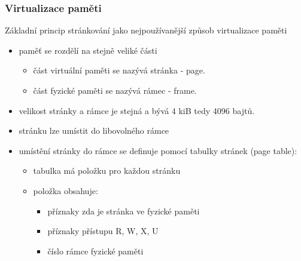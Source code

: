 \documentclass{beamer}
\begin{document}
\begin{frame}
\frametitle{Virtualizace paměti}

Základní princip stránkování jako nejpoužívanější způsob virtualizace paměti
\begin{itemize}
\item paměť se rozdělí na stejně veliké části
\begin{itemize}
\item část virtuální paměti se nazývá stránka - page.
\item část fyzické paměti se nazývá rámec - frame.
\end{itemize}
\item velikost stránky a rámce je stejná a bývá 4 kiB tedy 4096 bajtů.
\item stránku lze umístit do libovolného rámce
\item umístění stránky do rámce se definuje pomocí tabulky stránek (page table):
\begin{itemize}
 \item tabulka má položku pro každou stránku
 \item položka obsahuje:
\begin{itemize}
 \item příznaky zda je stránka ve fyzické paměti
 \item příznaky přístupu R, W, X, U
 \item číslo rámce fyzické paměti
\end{itemize}
\end{itemize}
\end{itemize}
\end{frame}
\end{document}
